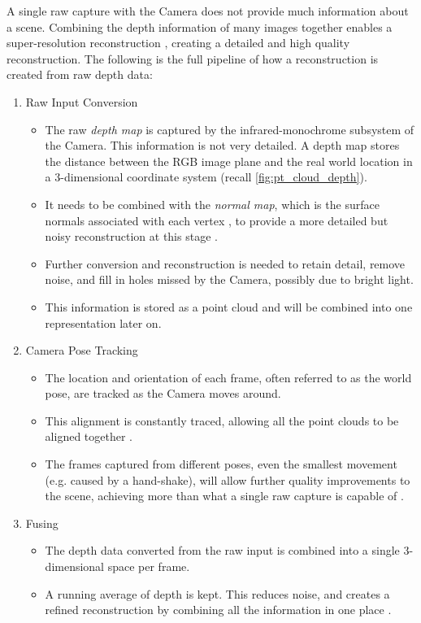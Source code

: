 A single raw capture with the Camera does not provide much information about a scene. Combining the depth information of many images together enables a super-resolution reconstruction \cite{ms-3d-paper}, creating a detailed and high quality reconstruction. The following is the full pipeline of how a reconstruction is created from raw depth data:
\newpage
\begin{enumerate}
  \item Raw Input Conversion
    \begin{itemize}
      \item The raw \textit{depth map} is captured by the infrared-monochrome subsystem of the Camera. This information is not very detailed. A depth map stores the distance between the RGB image plane and the real world location in a 3-dimensional coordinate system (recall \autoref{fig:pt_cloud_depth}).
      \item It needs to be combined with the \textit{normal map}, which is the surface normals associated with each vertex \cite{szeliski-book}, to provide a more detailed but noisy reconstruction at this stage \cite{kinect-doc}. 
      \item Further conversion and reconstruction is needed to retain detail, remove noise, and fill in holes missed by the Camera, possibly due to bright light.
      \item This information is stored as a point cloud and will be combined into one representation later on.
    \end{itemize}

  \item Camera Pose Tracking
    \begin{itemize}
      \item The location and orientation of each frame, often referred to as the world pose, are tracked as the Camera moves around.
      \item This alignment is constantly traced, allowing all the point clouds to be aligned together \cite{kinect-doc}. 
      \item The frames captured from different poses, even the smallest movement (e.g. caused by a hand-shake), will allow further quality improvements to the scene, achieving more than what a single raw capture is capable of \cite{ms-3d-paper}.
    \end{itemize}

  \item Fusing 
    \begin{itemize}
      \item The depth data converted from the raw input is combined into a single 3-dimensional space per frame.
      \item A running average of depth is kept. This reduces noise, and creates a refined reconstruction by combining all the information in one place \cite{kinect-doc} \cite{ms-3d-paper}. 
    \end{itemize}


\end{enumerate}
